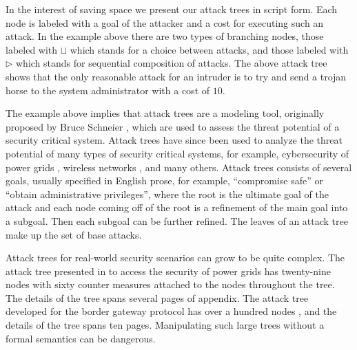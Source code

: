 \documentclass{sigplanconf}
\begin{document}
In the interest of saving space we present our attack trees in script
form.  Each node is labeled with a goal of the attacker and a cost for
executing such an attack. In the example above there are two types of
branching nodes, those labeled with $\sqcup$ which stands for a choice
between attacks, and those labeled with $\rhd$ which stands for
sequential composition of attacks.  The above attack tree shows that
the only reasonable attack for an intruder is to try and send a trojan
horse to the system administrator with a cost of $10$.

The example above implies that attack trees are a modeling tool,
originally proposed by Bruce Schneier \cite{Schneier:1999}, which are
used to assess the threat potential of a security critical system.
Attack trees have since been used to analyze the threat potential of
many types of security critical systems, for example, cybersecurity of
power grids \cite{Ten:2007}, wireless networks \cite{Reinhardt:2012},
and many others.  Attack trees consists of several goals, usually
specified in English prose, for example, ``compromise safe'' or
``obtain administrative privileges'', where the root is the ultimate
goal of the attack and each node coming off of the root is a
refinement of the main goal into a subgoal.  Then each subgoal can be
further refined.  The leaves of an attack tree make up the set of base
attacks.  


Attack trees for real-world security scenarios can grow to be quite
complex.  The attack tree presented in \cite{Ten:2007} to access the
security of power grids has twenty-nine nodes with sixty counter
measures attached to the nodes throughout the tree.  The details of
the tree spans several pages of appendix.  The attack tree developed
for the border gateway protocol has over a hundred nodes
\cite{Convey:2003}, and the details of the tree spans ten pages.
Manipulating such large trees without a formal semantics can be
dangerous.
\end{document}
